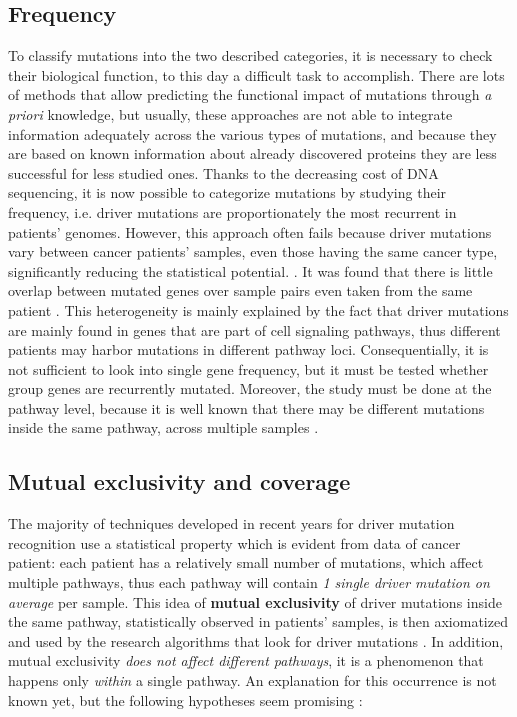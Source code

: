 \subsection{Frequency}

To classify mutations into the two described categories, it is necessary to check their biological function, to this day a difficult task to accomplish. There are lots of methods that allow predicting the functional impact of mutations through \textit{a priori} knowledge, but usually, these approaches are not able to integrate information adequately across the various types of mutations, and because they are based on known information about already discovered proteins they are less successful for less studied ones. Thanks to the decreasing cost of DNA sequencing, it is now possible to categorize mutations by studying their frequency, i.e. driver mutations are proportionately the most recurrent in patients' genomes. However, this approach often fails because driver mutations vary between cancer patients' samples, even those having the same cancer type, significantly reducing the statistical potential. \cite{multi-dendrix}. It was found that there is little overlap between mutated genes over sample pairs even taken from the same patient \cite{mdpfinder}. This heterogeneity is mainly explained by the fact that driver mutations are mainly found in genes that are part of cell signaling pathways, thus different patients may harbor mutations in different pathway loci. Consequentially, it is not sufficient to look into single gene frequency, but it must be tested whether group genes are recurrently mutated. Moreover, the study must be done at the pathway level, because it is well known that there may be different mutations inside the same pathway, across multiple samples \cite{multi-dendrix}. 

\subsection{Mutual exclusivity and coverage}

 The majority of techniques developed in recent years for driver mutation recognition use a statistical property which is evident from data of cancer patient: each patient has a relatively small number of mutations, which affect multiple pathways, thus each pathway will contain \textit{1 single driver mutation on average} per sample. This idea of \textbf{mutual exclusivity} of driver mutations inside the same pathway, statistically observed in patients' samples, is then axiomatized and used by the research algorithms that look for driver mutations \cite{multi-dendrix}. In addition, mutual exclusivity \textit{does not affect different pathways}, it is a phenomenon that happens only \textit{within} a single pathway. An explanation for this occurrence is not known yet, but the following hypotheses seem promising \cite{survey, mutual_exclusivity_expls}:

